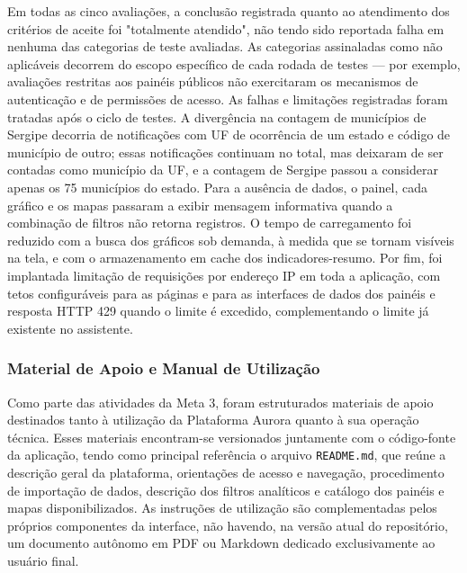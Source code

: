 \documentclass[11pt,a4paper]{article}
\begin{document}
Em todas as cinco avaliações, a conclusão registrada quanto ao atendimento dos critérios de aceite foi "totalmente atendido", não tendo sido reportada falha em nenhuma das categorias de teste avaliadas. As categorias assinaladas como não aplicáveis decorrem do escopo específico de cada rodada de testes — por exemplo, avaliações restritas aos painéis públicos não exercitaram os mecanismos de autenticação e de permissões de acesso. As falhas e limitações registradas foram tratadas após o ciclo de testes. A divergência na contagem de municípios de Sergipe decorria de notificações com UF de ocorrência de um estado e código de município de outro; essas notificações continuam no total, mas deixaram de ser contadas como município da UF, e a contagem de Sergipe passou a considerar apenas os 75 municípios do estado. Para a ausência de dados, o painel, cada gráfico e os mapas passaram a exibir mensagem informativa quando a combinação de filtros não retorna registros. O tempo de carregamento foi reduzido com a busca dos gráficos sob demanda, à medida que se tornam visíveis na tela, e com o armazenamento em cache dos indicadores-resumo. Por fim, foi implantada limitação de requisições por endereço IP em toda a aplicação, com tetos configuráveis para as páginas e para as interfaces de dados dos painéis e resposta HTTP 429 quando o limite é excedido, complementando o limite já existente no assistente.

\subsubsection{Material de Apoio e Manual de Utilização}
\label{subsubsec:material_apoio_manual_meta3}

Como parte das atividades da Meta 3, foram estruturados materiais de apoio destinados tanto à utilização da Plataforma Aurora quanto à sua operação técnica. Esses materiais encontram-se versionados juntamente com o código-fonte da aplicação, tendo como principal referência o arquivo \texttt{README.md}, que reúne a descrição geral da plataforma, orientações de acesso e navegação, procedimento de importação de dados, descrição dos filtros analíticos e catálogo dos painéis e mapas disponibilizados. As instruções de utilização são complementadas pelos próprios componentes da interface, não havendo, na versão atual do repositório, um documento autônomo em PDF ou Markdown dedicado exclusivamente ao usuário final.
\end{document}
